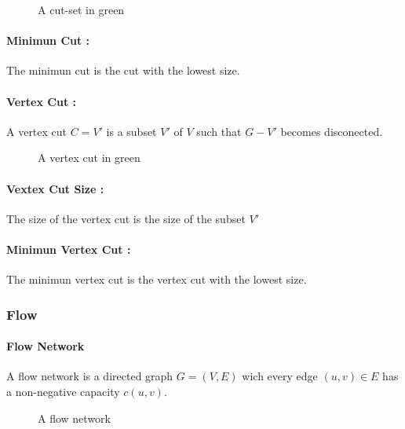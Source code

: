 \begin{figure}[!h]
  \begin{center}
    
  \end{center}
  \caption{A cut-set in green}
\end{figure}

\paragraph{Minimun Cut :} 
The minimun cut is the cut with the lowest size. 

\paragraph{Vertex Cut :}
A vertex cut $C=V'$ is a subset $V'$ of $V$ such that $G-V'$ becomes disconected.

\begin{figure}[!h]
  \begin{center}
    
  \end{center}
  \caption{A vertex cut in green}
\end{figure}


\paragraph{Vextex Cut Size :}
The size of the  vertex cut is the size of the subset $V'$

\paragraph{Minimun Vertex Cut :}
The minimun vertex cut is the vertex cut with the lowest size.

\subsubsection{Flow}
\paragraph{Flow Network}
A flow network is a directed graph $G=(V,E)$ wich every edge $(u,v) \in E$ has a non-negative capacity $c(u,v)$.

\begin{figure}[!h]
  \begin{center}
    
  \end{center}
  \caption{A flow network}
\end{figure}

